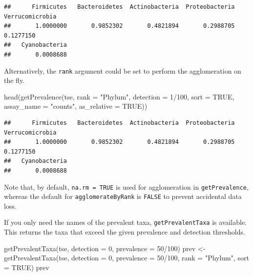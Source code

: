 \documentclass[
]{book}
\newenvironment{Shaded}{\begin{snugshade}}{\end{snugshade}}
\newcommand{\AttributeTok}[1]{\textcolor[rgb]{0.77,0.63,0.00}{#1}}
\newcommand{\ConstantTok}[1]{\textcolor[rgb]{0.00,0.00,0.00}{#1}}
\newcommand{\DecValTok}[1]{\textcolor[rgb]{0.00,0.00,0.81}{#1}}
\newcommand{\FunctionTok}[1]{\textcolor[rgb]{0.00,0.00,0.00}{#1}}
\newcommand{\NormalTok}[1]{#1}
\newcommand{\OtherTok}[1]{\textcolor[rgb]{0.56,0.35,0.01}{#1}}
\newcommand{\SpecialCharTok}[1]{\textcolor[rgb]{0.00,0.00,0.00}{#1}}
\newcommand{\StringTok}[1]{\textcolor[rgb]{0.31,0.60,0.02}{#1}}
\begin{document}
\begin{verbatim}
##      Firmicutes   Bacteroidetes  Actinobacteria  Proteobacteria Verrucomicrobia 
##       1.0000000       0.9852302       0.4821894       0.2988705       0.1277150 
##   Cyanobacteria 
##       0.0008688
\end{verbatim}

Alternatively, the \texttt{rank} argument could be set to perform the
agglomeration on the fly.

\begin{Shaded}
\begin{Highlighting}[]
\FunctionTok{head}\NormalTok{(}\FunctionTok{getPrevalence}\NormalTok{(tse, }\AttributeTok{rank =} \StringTok{"Phylum"}\NormalTok{, }\AttributeTok{detection =} \DecValTok{1}\SpecialCharTok{/}\DecValTok{100}\NormalTok{, }\AttributeTok{sort =} \ConstantTok{TRUE}\NormalTok{,}
                   \AttributeTok{assay\_name =} \StringTok{"counts"}\NormalTok{, }\AttributeTok{as\_relative =} \ConstantTok{TRUE}\NormalTok{))}
\end{Highlighting}
\end{Shaded}

\begin{verbatim}
##      Firmicutes   Bacteroidetes  Actinobacteria  Proteobacteria Verrucomicrobia 
##       1.0000000       0.9852302       0.4821894       0.2988705       0.1277150 
##   Cyanobacteria 
##       0.0008688
\end{verbatim}

Note that, by default, \texttt{na.rm\ =\ TRUE} is used for agglomeration in
\texttt{getPrevalence}, whereas the default for \texttt{agglomerateByRank} is
\texttt{FALSE} to prevent accidental data loss.

If you only need the names of the prevalent taxa, \texttt{getPrevalentTaxa}
is available. This returns the taxa that exceed the given prevalence
and detection thresholds.

\begin{Shaded}
\begin{Highlighting}[]
\FunctionTok{getPrevalentTaxa}\NormalTok{(tse, }\AttributeTok{detection =} \DecValTok{0}\NormalTok{, }\AttributeTok{prevalence =} \DecValTok{50}\SpecialCharTok{/}\DecValTok{100}\NormalTok{)}
\NormalTok{prev }\OtherTok{\textless{}{-}} \FunctionTok{getPrevalentTaxa}\NormalTok{(tse, }\AttributeTok{detection =} \DecValTok{0}\NormalTok{, }\AttributeTok{prevalence =} \DecValTok{50}\SpecialCharTok{/}\DecValTok{100}\NormalTok{,}
                         \AttributeTok{rank =} \StringTok{"Phylum"}\NormalTok{, }\AttributeTok{sort =} \ConstantTok{TRUE}\NormalTok{)}
\NormalTok{prev}
\end{Highlighting}
\end{Shaded}
\end{document}
